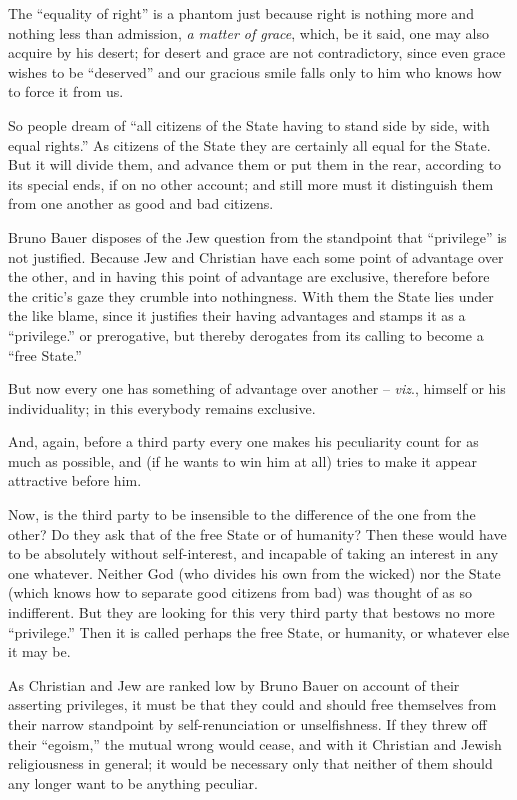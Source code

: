 \documentclass[12pt,a4paper]{book}
\begin{document}
The ``equality of right'' is a phantom just because right is nothing more 
and nothing less than admission, \textit{a matter of grace}, which, be it 
said, one may also acquire by his desert; for desert and grace are not 
contradictory, since even grace wishes to be ``deserved'' and our gracious 
smile falls only to him who knows how to force it from us.

So people dream of ``all citizens of the State having to stand side by side, 
with equal rights.'' As citizens of the State they are certainly all equal 
for the State. But it will divide them, and advance them or put them in the 
rear, according to its special ends, if on no other account; and still more 
must it distinguish them from one another as good and bad citizens.

Bruno Bauer disposes of the Jew question from the standpoint that 
``privilege'' is not justified. Because Jew and Christian have each some 
point of advantage over the other, and in having this point of advantage are 
exclusive, therefore before the critic's gaze they crumble into nothingness. 
With them the State lies under the like blame, since it justifies their having 
advantages and stamps it as a ``privilege.'' or prerogative, but thereby 
derogates from its calling to become a ``free State.''

But now every one has something of advantage over another -- \textit{viz}., 
himself or his individuality; in this everybody remains exclusive.

And, again, before a third party every one makes his peculiarity count for as 
much as possible, and (if he wants to win him at all) tries to make it appear 
attractive before him.

Now, is the third party to be insensible to the difference of the one from the 
other? Do they ask that of the free State or of humanity? Then these would 
have to be absolutely without self-interest, and incapable of taking an 
interest in any one whatever. Neither God (who divides his own from the 
wicked) nor the State (which knows how to separate good citizens from bad) was 
thought of as so indifferent. But they are looking for this very third party 
that bestows no more ``privilege.'' Then it is called perhaps the free 
State, or humanity, or whatever else it may be.

As Christian and Jew are ranked low by Bruno Bauer on account of their 
asserting privileges, it must be that they could and should free themselves 
from their narrow standpoint by self-renunciation or unselfishness. If they 
threw off their ``egoism,'' the mutual wrong would cease, and with it 
Christian and Jewish religiousness in general; it would be necessary only that 
neither of them should any longer want to be anything peculiar.
\end{document}
